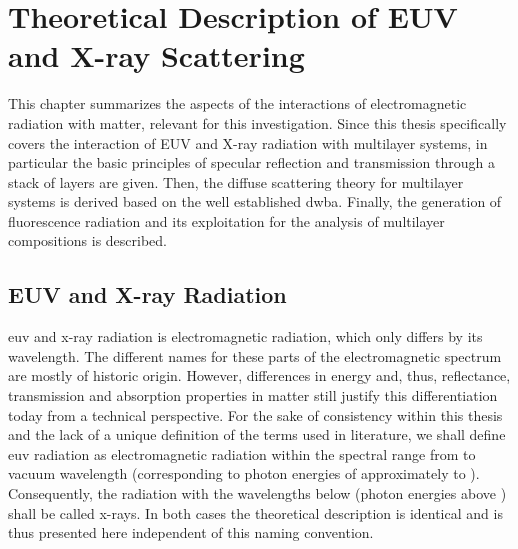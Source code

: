 \chapter{Theoretical Description of EUV and X-ray Scattering} \label{ch_theo}
This chapter summarizes the aspects of the interactions of electromagnetic radiation with matter, relevant for this investigation. Since this thesis specifically covers the interaction of EUV and X-ray radiation with multilayer systems, in particular the basic principles of specular reflection and transmission through a stack of layers are given. Then, the diffuse scattering theory for multilayer systems is derived based on the well established \gls{dwba}. Finally, the generation of fluorescence radiation and its exploitation for the analysis of multilayer compositions is described.

\section{EUV and X-ray Radiation}
\Gls{euv} and x-ray radiation is electromagnetic radiation, which only differs by its wavelength. The different names for these parts of the electromagnetic spectrum are mostly of historic origin. However, differences in energy and, thus, reflectance, transmission and absorption properties in matter still justify this differentiation today from a technical perspective. For the sake of consistency within this thesis and the lack of a unique definition of the terms used in literature, we shall define \gls{euv} radiation as electromagnetic radiation within the spectral range from  to  vacuum wavelength (corresponding to photon energies of approximately  to ). Consequently, the radiation with the wavelengths below  (photon energies above ) shall be called x-rays. In both cases the theoretical description is identical and is thus presented here independent of this naming convention.

